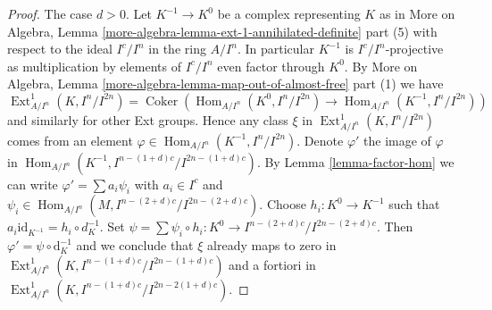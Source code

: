 \documentclass[10pt,a4paper]{amsart}
\theoremstyle{plain}
\theoremstyle{definition}
\theoremstyle{remark}
\numberwithin{equation}{subsection}
\def\Hom{\mathop{\mathrm{Hom}}\nolimits}
\def\Ext{\mathop{\mathrm{Ext}}\nolimits}
\def\Coker{\mathop{\mathrm{Coker}}}
\begin{document}
\begin{proof}
The case $d > 0$. Let $K^{-1} \to K^0$ be a complex representing $K$ as in
More on Algebra, Lemma \ref{more-algebra-lemma-ext-1-annihilated-definite}
part (5) with respect to the ideal $I^c/I^n$ in the ring $A/I^n$.
In particular $K^{-1}$ is $I^c/I^n$-projective as multiplication
by elements of $I^c/I^n$ even factor through $K^0$. By
More on Algebra, Lemma \ref{more-algebra-lemma-map-out-of-almost-free} part (1)
we have
$$
\Ext^1_{A/I^n}(K, I^n/I^{2n}) =
\Coker(\Hom_{A/I^n}(K^0, I^n/I^{2n}) \to \Hom_{A/I^n}(K^{-1}, I^n/I^{2n}))
$$
and similarly for other Ext groups. Hence any class $\xi$ in
$\Ext^1_{A/I^n}(K, I^n/I^{2n})$
comes from an element $\varphi \in \Hom_{A/I^n}(K^{-1}, I^n/I^{2n})$.
Denote $\varphi'$ the image of $\varphi$ in
$\Hom_{A/I^n}(K^{-1}, I^{n - (1 + d)c}/I^{2n - (1 + d)c})$.
By Lemma \ref{lemma-factor-hom}
we can write $\varphi' = \sum a_i \psi_i$ with $a_i \in I^c$ and
$\psi_i \in \Hom_{A/I^n}(M, I^{n - (2 + d)c}/I^{2n - (2 + d)c})$.
Choose $h_i : K^0 \to K^{-1}$ such that
$a_i \text{id}_{K^{-1}} = h_i \circ d_K^{-1}$. Set
$\psi = \sum \psi_i \circ h_i : K^0 \to I^{n - (2 + d)c}/I^{2n - (2 + d)c}$.
Then $\varphi' = \psi \circ \text{d}_K^{-1}$ and we conclude that
$\xi$ already maps to zero in
$\Ext^1_{A/I^n}(K, I^{n - (1 + d)c}/I^{2n - (1 + d)c})$
and a fortiori in
$\Ext^1_{A/I^n}(K, I^{n - (1 + d)c}/I^{2n - 2(1 + d)c})$.


\end{proof}
\end{document}
